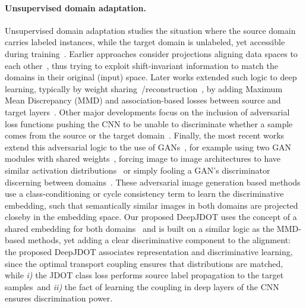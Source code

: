 \documentclass[runningheads]{llncs}
\begin{document}
\paragraph{Unsupervised domain adaptation.} Unsupervised domain adaptation studies the situation where the source domain carries labeled instances, while the target domain is unlabeled, yet accessible during training~\cite{BenD07}. 
Earlier approaches consider projections aligning data spaces to each other~\cite{saenko10,Jhuo12,Hoffman_ICLR2013}, thus trying to exploit shift-invariant information to match the domains in their original (input) space. Later works extended such logic to deep learning, typically by weight sharing~\cite{deepcoral}/reconstruction~\cite{Alj16}, by adding Maximum Mean Discrepancy (MMD) and association-based losses between source and target layers~\cite{LongMMD,Lon16,AssocDA}. Other major developments focus on the inclusion of adversarial loss functions pushing the CNN to be unable to discriminate whether a sample comes from the source or the target domain~\cite{LEL,Ganin2016,Tzeng15}. Finally, the most recent works extend this adversarial logic to the use of GANs~\cite{UNIT,GenToAdapt}, for example using two GAN modules with shared weights~\cite{CoGAN}, forcing image to image architecture{s} to have similar activation distributions~\cite{I2IAdapt} or simply fooling a GAN's discriminator discerning between domains~\cite{Adda}. These adversarial image generation based methods \cite{UNIT,GenToAdapt,I2IAdapt} use a class-conditioning or cycle consistency term to learn the discriminative embedding, such that semantically similar images in both domains are projected closeby in the embedding space. Our proposed DeepJDOT uses the concept of a shared embedding for both domains~\cite{Tzeng15} and is built on a similar logic as the MMD-based methods, yet adding a clear discriminative component to the alignment: 
the proposed DeepJDOT associates representation and discriminative learning, since the optimal transport coupling ensures that distributions are matched, while {\em i)} the JDOT class loss performs source label propagation to the target samples\, and {\em ii)} the fact of learning the coupling in deep layers of the CNN ensures discrimination power.  
\end{document}

